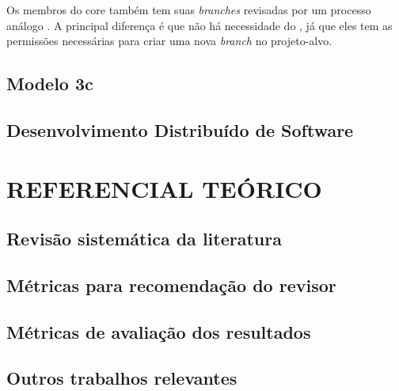 \documentclass[preprint,12pt]{elsarticle}
\begin{document}
    Os membros do core também tem suas \textit{branches} revisadas por um processo análogo \cite{6385140,Bosu2014}. A principal diferença é que não há necessidade do , já que eles tem as permissões necessárias para criar uma nova \textit{branch} no projeto-alvo.

  \section{Modelo 3c}\label{sec:modelo_3c}

  \section{Desenvolvimento Distribuído de Software}\label{sec:dds}


\chapter{REFERENCIAL TEÓRICO}\label{chap:trabalhos_relacionados}

  \section{Revisão sistemática da literatura}\label{sec:revisao_sistematica}

  \section{Métricas para recomendação do revisor}\label{sec:metricas_revisor}

  \section{Métricas de avaliação dos resultados}\label{sec:metricas_resultados}

  \section{Outros trabalhos relevantes}\label{sec:outros_trabalhos}
\end{document}
